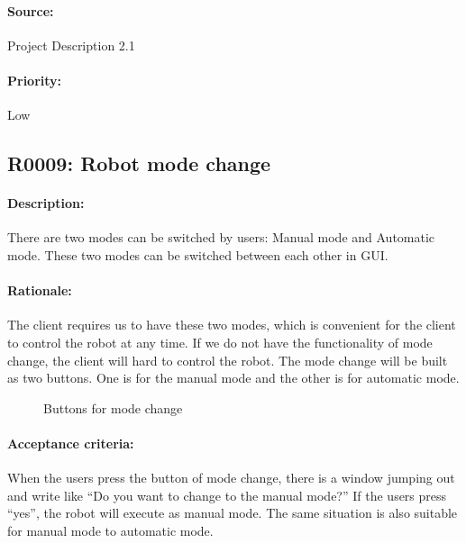 \documentclass[11pt, a4paper]{report}
\begin{document}
\paragraph{Source:}
 Project Description 2.1
\paragraph{Priority:}
Low



\subsection{R0009: Robot mode change}
\paragraph{Description:}
There are two modes can be switched by users: Manual mode and Automatic mode. These two modes can be switched between each other in GUI. 
\paragraph{Rationale:}
The client requires us to have these two modes, which is convenient for the client to control the robot at any time. If we do not have the functionality of mode change, the client will hard to control the robot. The mode change will be built as two buttons. One is for the manual mode and the other is for automatic mode.
\begin{figure}[ht]
\centering
\setlength\fboxsep{2pt}
\setlength\fboxrule{0.2pt}
\caption{Buttons for mode change}
\label{sec:NXJCC}
\label{fig:NXJCC}
\end{figure}

\paragraph{Acceptance criteria:}
When the users press the button of mode change, there is a window jumping out and write like “Do you want to change to the manual mode?” If the users press “yes”, the robot will execute as manual mode. The same situation is also suitable for manual mode to automatic mode.
\end{document}
